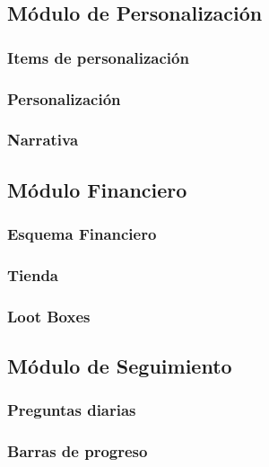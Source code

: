 \subsection{Módulo de Personalización}

\subsubsection{Items de personalización}
\subsubsection{Personalización}
\subsubsection{Narrativa}

\subsection{Módulo Financiero}

\subsubsection{Esquema Financiero}
\subsubsection{Tienda}
\subsubsection{Loot Boxes}

\subsection{Módulo de Seguimiento}

\subsubsection{Preguntas diarias}
\subsubsection{Barras de progreso}



%

